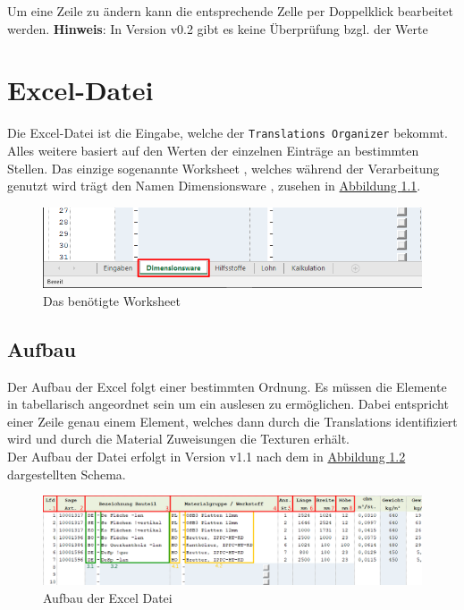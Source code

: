 \documentclass{book}
\newcommand{\assisttool}{\texttt{Translations Organizer}\xspace}
\newcommand{\hinweis}[1]{\newline \textbf{Hinweis}: #1 \newline}
\begin{document}
		 	Um eine Zeile zu ändern kann die entsprechende Zelle per Doppelklick bearbeitet werden.
		 	\hinweis{In Version v0.2 gibt es keine Überprüfung bzgl. der Werte}
	 	
	\chapter{Excel-Datei}\label{excel}
		Die Excel-Datei ist die Eingabe, welche der \assisttool bekommt. Alles weitere basiert auf den Werten der einzelnen Einträge an bestimmten Stellen. Das einzige sogenannte \glqq Worksheet \grqq, welches während der Verarbeitung genutzt wird trägt den Namen \glqq Dimensionsware \grqq, zusehen in \hyperref[fig:dimensionsware worksheet]{Abbildung \ref{fig:dimensionsware worksheet}}.		
		\begin{figure}[H]
			\centering
			\includegraphics[scale=0.48]{pics/excel/reiter_auswaehlen.png}
			\caption{Das benötigte \glqq Worksheet \grqq}
			\label{fig:dimensionsware worksheet}
		\end{figure}
		
		\section{Aufbau}
			Der Aufbau der Excel folgt einer bestimmten Ordnung. Es müssen die Elemente in tabellarisch angeordnet sein um ein auslesen zu ermöglichen. Dabei entspricht einer Zeile genau einem Element, welches dann durch die Translations identifiziert wird und durch die Material Zuweisungen die Texturen erhält. \\
			Der Aufbau der Datei erfolgt in Version v1.1 nach dem in \hyperref[fig:excel file]{Abbildung \ref{fig:excel file}} dargestellten Schema.
			
			\begin{figure}[H]
				\centering
				\includegraphics[scale=0.48]{pics/excel/dimensionsware.png}
				\caption{Aufbau der Excel Datei}
				\label{fig:excel file}
			\end{figure}
		
\end{document}
